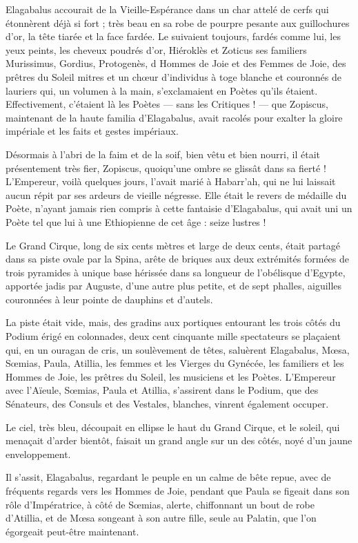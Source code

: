 \documentclass[a4paper, 11pt, oneside, polutonikogreek, french]{article}
\begin{document}
Elagabalus accourait de la Vieille-Espérance dans un char attelé de cerfs qui étonnèrent déjà si fort ; très beau en sa robe de pourpre pesante aux guillochures d'or, la tête tiarée et la face fardée. Le suivaient toujours, fardés comme lui, les yeux peints, les cheveux poudrés d'or, Hiéroklès et Zoticus ses familiers Murissimus, Gordius, Protogenès, d Hommes de Joie et des Femmes de Joie, des prêtres du Soleil mitres et un chœur d'individus à toge blanche et couronnés de lauriers qui, un volumen à la main, s'exclamaient en Poètes qu'ils étaient. Effectivement, c'étaient là les Poètes --- sans les Critiques ! --- que Zopiscus, maintenant de la haute familia d'Elagabalus, avait racolés pour exalter la gloire impériale et les faits et gestes impériaux.

Désormais à l'abri de la faim et de la soif, bien vêtu et bien nourri, il était présentement très fier, Zopiscus, quoiqu'une ombre se glissât dans sa fierté ! L'Empereur, voilà quelques jours, l'avait marié à Habarr'ah, qui ne lui laissait aucun répit par ses ardeurs de vieille négresse. Elle était le revers de médaille du Poète, n'ayant jamais rien compris à cette fantaisie d'Elagabalus, qui avait uni un Poète tel que lui à une Ethiopienne de cet âge : seize lustres !

Le Grand Cirque, long de six cents mètres et large de deux cents, était partagé dans sa piste ovale par la Spina, arête de briques aux deux extrémités formées de trois pyramides à unique base hérissée dans sa longueur de l'obélisque d'Egypte, apportée jadis par Auguste, d'une autre plus petite, et de sept phalles, aiguilles couronnées à leur pointe de dauphins et d'autels.

La piste était vide, mais, des gradins aux portiques entourant les trois côtés du Podium érigé en colonnades, deux cent cinquante mille spectateurs se plaçaient qui, en un ouragan de cris, un soulèvement de têtes, saluèrent Elagabalus, Mœsa, Sœmias, Paula, Atillia, les femmes et les Vierges du Gynécée, les familiers et les Hommes de Joie, les prêtres du Soleil, les musiciens et les Poètes. L'Empereur avec l'Aïeule, Sœmias, Paula et Atillia, s'assirent dans le Podium, que des Sénateurs, des Consuls et des Vestales, blanches, vinrent également occuper.

Le ciel, très bleu, découpait en ellipse le haut du Grand Cirque, et le soleil, qui menaçait d'arder bientôt, faisait un grand angle sur un des côtés, noyé d'un jaune enveloppement.

Il s'assit, Elagabalus, regardant le peuple en un calme de bête repue, avec de fréquents regards vers les Hommes de Joie, pendant que Paula se figeait dans son rôle d'Impératrice, à côté de Sœmias, alerte, chiffonnant un bout de robe d'Atillia, et de Mœsa songeant à son autre fille, seule au Palatin, que l'on égorgeait peut-être maintenant.
\end{document}
